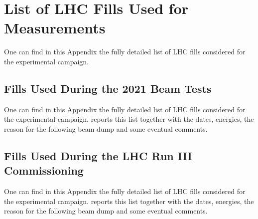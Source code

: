 \chapter{List of LHC Fills Used for Measurements} %

\label{AppendixC} %

One can find in this Appendix the fully detailed list of LHC fills considered for the experimental campaign.



\section{Fills Used During the 2021 Beam Tests}

One can find in this Appendix the fully detailed list of LHC fills considered for the experimental campaign.
 reports this list together with the dates, energies, the reason for the following beam dump and some eventual comments.


 \section{Fills Used During the LHC Run III Commissioning}

One can find in this Appendix the fully detailed list of LHC fills considered for the experimental campaign.
 reports this list together with the dates, energies, the reason for the following beam dump and some eventual comments.

